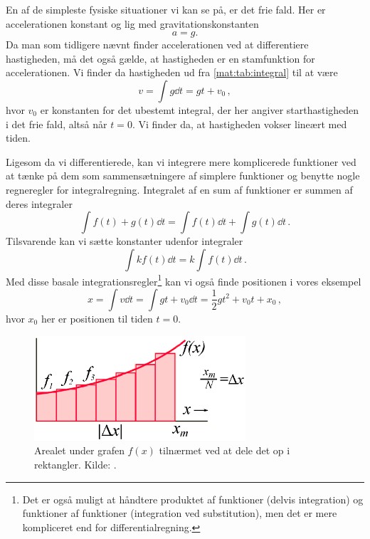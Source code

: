 En af de simpleste fysiske situationer vi kan se på, er det frie fald.
Her er accelerationen konstant og lig med gravitationskonstanten
\begin{equation*}
    a=g.
\end{equation*}
Da man som tidligere nævnt finder accelerationen ved at differentiere hastigheden, må det også gælde, at hastigheden er en stamfunktion for accelerationen. Vi finder da hastigheden ud fra \cref{mat:tab:integral} til at være
\begin{equation*}
    v=\int g\dd{t}=gt+v_0 \, ,
\end{equation*}
hvor $v_0$ er konstanten for det ubestemt integral, der her angiver starthastigheden i det frie fald, altså når $t=0$. Vi finder da, at hastigheden vokser lineært med tiden.

Ligesom da vi differentierede, kan vi integrere mere komplicerede funktioner ved at tænke på dem som sammensætningere af simplere funktioner og benytte nogle regneregler for integralregning.
Integralet af en sum af funktioner er summen af deres integraler
\begin{equation}
\int f(t)+g(t)\dd{t}=\int f(t)\dd{t}+\int g(t)\dd{t} \, .
\end{equation}
Tilsvarende kan vi sætte konstanter udenfor integraler
\begin{equation} \label{mat:eq:konstant}
\int kf(t)\dd{t}=k\int f(t)\dd{t} \, .
\end{equation}
Med disse basale integrationsregler\footnote{Det er også muligt at håndtere produktet af funktioner (delvis integration) og funktioner af funktioner (integration ved substitution), men det er mere kompliceret end for differentialregning.} kan vi også finde positionen i vores eksempel
\begin{equation*}
    x=\int v\dd{t}=\int gt+v_0\dd{t}=\frac{1}{2}gt^2+v_0t+x_0 \, ,
\end{equation*}
hvor $x_0$ her er positionen til tiden $t=0$.

\begin{figure}[]
    \centering
    \includegraphics[width = 0.7\textwidth]{matfig/integral.eps}
    \caption{Arealet under grafen $f(x)$ tilnærmet ved at dele det op i rektangler. Kilde: \cite{Integral}.}
    \label{mat:fig:integralapprox}
\end{figure}
%
